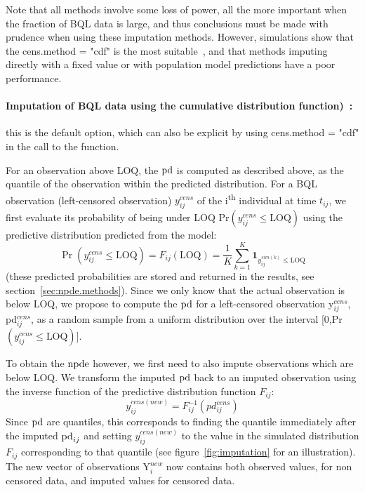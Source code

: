 Note that all methods involve some loss of power, all the more important when the fraction of BQL data is large, and thus conclusions must be made with prudence when using these imputation methods. However, simulations show that the {\sf cens.method = "cdf"} is the most suitable~\cite{Nguyen2012}, and that methods imputing directly with a fixed value or with population model predictions have a poor performance.


\paragraph{Imputation of BQL data using the cumulative distribution
function)~\cite{Nguyen2012}:} this is the default option, which can also be explicit by using {\sf cens.method = "cdf"} in the call to the function.

For an observation above LOQ, the ${\rm pd}$ is computed as described above, as the quantile of the observation within the predicted distribution. For a BQL observation (left-censored observation) $y^{cens}_{ij}$ of the i\textsuperscript{th} individual at time $t_{ij}$, we first evaluate its probability of being under LOQ Pr$(y_{ij}^{cens}\leq\mbox{LOQ})$ using the predictive distribution 
predicted from the model:
\begin{equation}
\Pr(y_{ij}^{cens}\leq\mbox{LOQ})=F_{ij}(\mbox{LOQ})=\frac{1}{K}{\textstyle \overset{K}{\underset{k=1}{\sum}}\boldsymbol{1}_{y_{ij}^{sim(k)}\leq\mbox{LOQ}}}
\end{equation}
(these predicted probabilities are stored and returned in the results, see section~\ref{sec:npde.methods}). Since we only know that the actual observation is below LOQ, we propose to compute the ${\rm pd}$ for a left-censored observation y$_{ij}^{cens}$, pd$_{ij}^{cens}$, as a random sample from a uniform distribution over the interval [0,Pr$(y_{ij}^{cens}\leq\mbox{LOQ})]$.

To obtain the ${\rm npde}$ however, we first need to also impute observations which are below LOQ. We transform the imputed ${\rm pd}$ back to an imputed observation using the inverse function of the predictive distribution function $F_{ij}$: 
\begin{equation}
y_{ij}^{cens(new)}=F_{ij}^{-1}(pd_{ij}^{cens})
\end{equation}
Since ${\rm pd}$ are quantiles, this corresponds to finding the quantile immediately after the imputed ${\rm pd}_{ij}$ and setting $y_{ij}^{cens(new)}$ to the value in the simulated distribution $F_{ij}$ corresponding to that quantile (see figure~\ref{fig:imputation} for an illustration). The new vector of observations Y$_{i}^{new}$ now contains both observed values, for non censored data, and imputed values for censored data. 

